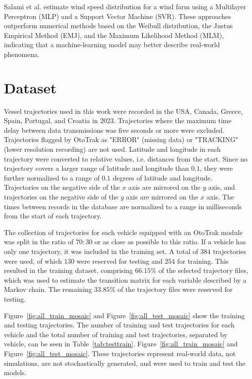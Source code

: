 \documentclass[preprint,12pt]{elsarticle}
\begin{document}
Salami et al. \citep{salami2022wind} estimate wind speed distribution for a wind farm using a Multilayer Perceptron (MLP) and a Support Vector Machine (SVR). These approaches outperform numerical methods based on the Weibull distribution, the Justus Empirical Method (EMJ), and the Maximum Likelihood Method (MLM), indicating that a machine-learning model may better describe real-world phenomena.

\section{Dataset}
\label{sec:Dataset}

Vessel trajectories used in this work were recorded in the USA, Canada, Greece, Spain, Portugal, and Croatia in 2023. Trajectories where the maximum time delay between data transmissions was five seconds or more were excluded. Trajectories flagged by OtoTrak \cite{ototrakOtoTrakTrack} as "ERROR" (missing data) or "TRACKING" (lower resolution recording) are not used. Latitude and longitude in each trajectory were converted to relative values, i.e. distances from the start. Since no trajectory covers a larger range of latitude and longitude than $0.1$, they were further normalized to a range of $0.1$ degrees of latitude and longitude. Trajectories on the negative side of the $x$ axis are mirrored on the $y$ axis, and trajectories on the negative side of the $y$ axis are mirrored on the $x$ axis. The times between records in the database are normalized to a range in milliseconds from the start of each trajectory.

The collection of trajectories for each vehicle equipped with an OtoTrak \cite{ototrakOtoTrakTrack} module was split in the ratio of $70:30$ or as close as possible to this ratio. If a vehicle has only one trajectory, it was included in the training set. A total of $384$ trajectories were used, of which $130$ were reserved for testing and $254$ for training. This resulted in the training dataset, comprising $66.15\%$ of the selected trajectory files, which was used to estimate the transition matrix for each variable described by a Markov chain. The remaining $33.85\%$ of the trajectory files were reserved for testing.

Figure~\ref{fig:all_train_mosaic} and Figure~\ref{fig:all_test_mosaic} show the training and testing trajectories. The number of training and test trajectories for each vehicle and the total number of training and test trajectories, separated by vehicle, can be seen in Table~\ref{tab:testtrain}. Figure~\ref{fig:all_train_mosaic} and Figure~\ref{fig:all_test_mosaic}. These trajectories represent real-world data, not simulations, are not stochastically generated, and were used to train and test the models.
\end{document}
